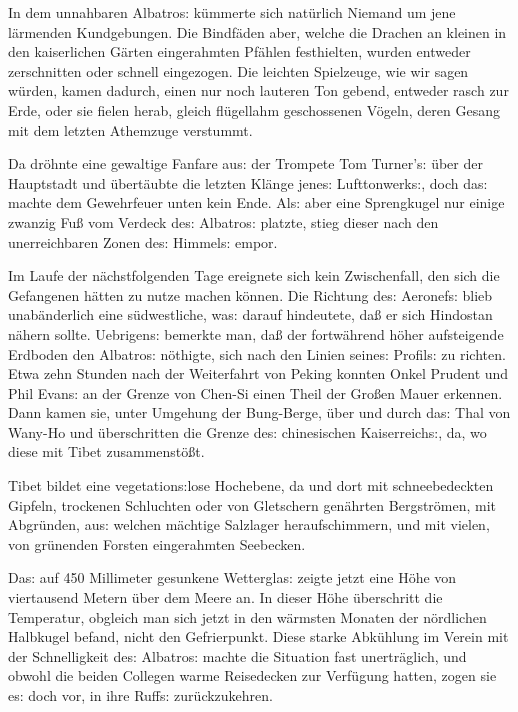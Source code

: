 \documentclass[oneside,12pt]{book}
\newcommand{\s}{s:}
\begin{document}
In dem unnahbaren {\glqq}Albatro{\s}{\grqq} k\"ummerte sich
nat\"urlich Niemand um jene l\"armenden Kundgebungen. Die Bindf\"aden
aber, welche die Drachen an kleinen in den kaiserlichen G\"arten
eingerahmten Pf\"ahlen festhielten, wurden entweder zerschnitten oder
schnell eingezogen. Die leichten {\glqq}Spielzeuge{\grqq}, wie wir
sagen w\"urden, kamen dadurch, einen nur noch lauteren Ton gebend,
entweder rasch zur Erde, oder sie fielen herab, gleich fl\"ugellahm
geschossenen V\"ogeln, deren Gesang mit dem letzten Athemzuge
verstummt.

Da dr\"ohnte eine gewaltige Fanfare au{\s} der Trompete Tom
Turner'{\s} \"uber der Hauptstadt und \"ubert\"aubte die letzten
Kl\"ange jene{\s} Lufttonwerk{\s}, doch da{\s} machte dem Gewehrfeuer
unten kein Ende. Al{\s} aber eine Sprengkugel nur einige zwanzig
Fu{\ss} vom Verdeck de{\s} {\glqq}Albatro{\s}{\grqq} platzte, stieg
dieser nach den unerreichbaren Zonen de{\s} Himmel{\s} empor.

Im Laufe der n\"achstfolgenden Tage ereignete sich kein Zwischenfall,
den sich die Gefangenen h\"atten zu nutze machen k\"onnen. Die
Richtung de{\s} Aeronef{\s} blieb unab\"anderlich eine
s\"udwestliche, wa{\s} darauf hindeutete, da{\ss} er sich Hindostan
n\"ahern sollte. Uebrigen{\s} bemerkte man, da{\ss} der fortw\"ahrend
h\"oher aufsteigende Erdboden den {\glqq}Albatro{\s}{\grqq}
n\"othigte, sich nach den Linien seine{\s} Profil{\s} zu richten.
Etwa zehn Stunden nach der Weiterfahrt von Peking konnten Onkel
Prudent und Phil Evan{\s} an der Grenze von Chen-Si einen Theil der
Gro{\ss}en Mauer erkennen. Dann kamen sie, unter Umgehung der
Bung-Berge, \"uber und durch da{\s} Thal von Wany-Ho und
\"uberschritten die Grenze de{\s} chinesischen Kaiserreich{\s}, da,
wo diese mit Tibet zusammenst\"o{\ss}t.

Tibet bildet eine vegetation{\s}lose Hochebene, da und dort mit
schneebedeckten Gipfeln, trockenen Schluchten oder von Gletschern
gen\"ahrten Bergstr\"omen, mit Abgr\"unden, au{\s} welchen m\"achtige
Salzlager heraufschimmern, und mit vielen, von gr\"unenden Forsten
eingerahmten Seebecken.

Da{\s} auf 450 Millimeter gesunkene Wettergla{\s} zeigte jetzt eine
H\"ohe von viertausend Metern \"uber dem Meere an. In dieser H\"ohe
\"uberschritt die Temperatur, obgleich man sich jetzt in den
w\"armsten Monaten der n\"ordlichen Halbkugel befand, nicht den
Gefrierpunkt. Diese starke Abk\"uhlung im Verein mit der
Schnelligkeit de{\s} {\glqq}Albatro{\s}{\grqq} machte die Situation
fast unertr\"aglich, und obwohl die beiden Collegen warme Reisedecken
zur Verf\"ugung hatten, zogen sie e{\s} doch vor, in ihre Ruff{\s}
zur\"uckzukehren.
\end{document}
